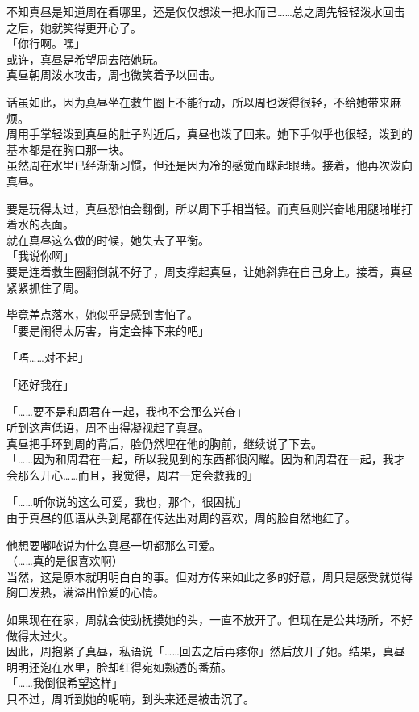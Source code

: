 不知真昼是知道周在看哪里，还是仅仅想泼一把水而已……总之周先轻轻泼水回击之后，她就笑得更开心了。\\

「你行啊。嘿」\\

或许，真昼是希望周去陪她玩。\\

真昼朝周泼水攻击，周也微笑着予以回击。

话虽如此，因为真昼坐在救生圈上不能行动，所以周也泼得很轻，不给她带来麻烦。\\

周用手掌轻泼到真昼的肚子附近后，真昼也泼了回来。她下手似乎也很轻，泼到的基本都是在胸口那一块。\\

虽然周在水里已经渐渐习惯，但还是因为冷的感觉而眯起眼睛。接着，他再次泼向真昼。

要是玩得太过，真昼恐怕会翻倒，所以周下手相当轻。而真昼则兴奋地用腿啪啪打着水的表面。\\

就在真昼这么做的时候，她失去了平衡。\\

「我说你啊」\\

要是连着救生圈翻倒就不好了，周支撑起真昼，让她斜靠在自己身上。接着，真昼紧紧抓住了周。

毕竟差点落水，她似乎是感到害怕了。\\

「要是闹得太厉害，肯定会摔下来的吧」

「唔……对不起」

「还好我在」

「……要不是和周君在一起，我也不会那么兴奋」\\

听到这声低语，周不由得凝视起了真昼。\\

真昼把手环到周的背后，脸仍然埋在他的胸前，继续说了下去。\\

「……因为和周君在一起，所以我见到的东西都很闪耀。因为和周君在一起，我才会那么开心……而且，我觉得，周君一定会救我的」

「……听你说的这么可爱，我也，那个，很困扰」\\

由于真昼的低语从头到尾都在传达出对周的喜欢，周的脸自然地红了。

他想要嘟哝说为什么真昼一切都那么可爱。\\

（……真的是很喜欢啊）\\

当然，这是原本就明明白白的事。但对方传来如此之多的好意，周只是感受就觉得胸口发热，满溢出怜爱的心情。

如果现在在家，周就会使劲抚摸她的头，一直不放开了。但现在是公共场所，不好做得太过火。\\

因此，周抱紧了真昼，私语说「……回去之后再疼你」然后放开了她。结果，真昼明明还泡在水里，脸却红得宛如熟透的番茄。\\

「……我倒很希望这样」\\

只不过，周听到她的呢喃，到头来还是被击沉了。
